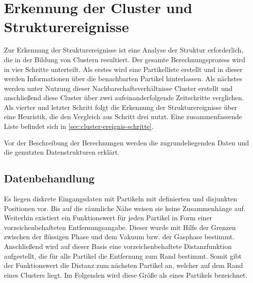 




\chapter{Erkennung der Cluster und Strukturereignisse}\label{sec:cluster-ereignisse}

Zur Erkennung der Strukturereignisse ist eine Analyse der Struktur erforderlich, die in der Bildung von Clustern resultiert. Der gesamte Berechnungsprozess wird in vier Schritte unterteilt. Als erstes wird eine Partikelliste erstellt und in dieser werden Informationen über die benachbarten Partikel hinterlassen. Als nächstes werden unter Nutzung dieser Nachbarschaftsverhältnisse Cluster erstellt und anschließend diese Cluster über zwei aufeinanderfolgende Zeitschritte verglichen. Als vierter und letzter Schritt folgt die Erkennung der Strukturereignisse über eine Heuristik, die den Vergleich aus Schritt drei nutzt. Eine zusammenfassende Liste befindet sich in \autoref{sec:cluster-ereignis-schritte}.

Vor der Beschreibung der Berechnungen werden die zugrundeliegenden Daten und die genutzten Datenstrukturen erklärt.

\section{Datenbehandlung}\label{sec:datenbehandlung}


Es liegen diskrete Eingangsdaten mit Partikeln mit definierten und disjunkten Positionen vor. Bis auf die räumliche Nähe weisen sie keine Zusammenhänge auf. Weiterhin existiert ein Funktionswert für jeden Partikel in Form einer vorzeichenbehafteten Entfernungsangabe. Dieser wurde mit Hilfe der Grenzen zwischen der flüssigen Phase und dem Vakuum bzw. der Gasphase bestimmt. Anschließend wird auf dieser Basis eine vorzeichenbehaftete Distanzfunktion aufgestellt, die für alle Partikel die Entfernung zum Rand bestimmt. Somit gibt der Funktionswert die Distanz zum nächsten Partikel an, welcher auf dem Rand eines Clusters liegt. Im Folgenden wird diese Größe als  eines Partikels bezeichnet.

